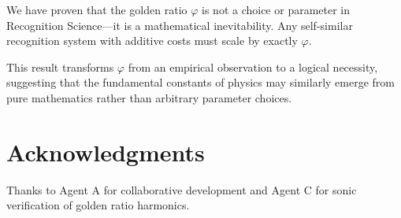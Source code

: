 \documentclass[11pt,a4paper]{article}
\begin{document}
We have proven that the golden ratio $\varphi$ is not a choice or parameter in Recognition Science—it is a mathematical inevitability. Any self-similar recognition system with additive costs must scale by exactly $\varphi$.

This result transforms $\varphi$ from an empirical observation to a logical necessity, suggesting that the fundamental constants of physics may similarly emerge from pure mathematics rather than arbitrary parameter choices.

\section*{Acknowledgments}

Thanks to Agent A for collaborative development and Agent C for sonic verification of golden ratio harmonics.
\end{document}

